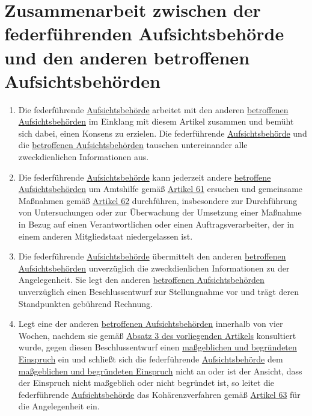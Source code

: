 \chapter{Zusammenarbeit zwischen der federführenden Aufsichtsbehörde und den anderen betroffenen Aufsichtsbehörden}
\label{ch:60}


\begin{enumerate}

  \item Die federführende \hyperref[itm:04-21]{Aufsichtsbehörde} arbeitet mit den anderen \hyperref[itm:04-22]{betroffenen Aufsichtsbehörden} im Einklang mit diesem
   Artikel zusammen und bemüht sich dabei, einen Konsens zu erzielen. Die federführende \hyperref[itm:04-21]{Aufsichtsbehörde} und die
   \hyperref[itm:04-22]{betroffenen Aufsichtsbehörden} tauschen untereinander alle zweckdienlichen Informationen aus.
  \label{itm:60-1}

  \item Die federführende \hyperref[itm:04-21]{Aufsichtsbehörde} kann jederzeit andere \hyperref[itm:04-22]{betroffene Aufsichtsbehörden} um Amtshilfe gemäß
  \hyperref[ch:61]{Artikel 61} ersuchen und gemeinsame Maßnahmen gemäß \hyperref[ch:62]{Artikel 62} durchführen,
   insbesondere zur Durchführung von Untersuchungen oder zur Überwachung der Umsetzung einer Maßnahme in Bezug auf
   einen Verantwortlichen oder einen Auftragsverarbeiter, der in einem anderen Mitgliedstaat niedergelassen ist.
  \label{itm:60-2}

  \item Die federführende \hyperref[itm:04-21]{Aufsichtsbehörde} übermittelt den anderen \hyperref[itm:04-22]{betroffenen Aufsichtsbehörden} unverzüglich die
   zweckdienlichen Informationen zu der Angelegenheit. Sie legt den anderen \hyperref[itm:04-22]{betroffenen Aufsichtsbehörden} unverzüglich
   einen Beschlussentwurf zur Stellungnahme vor und trägt deren Standpunkten gebührend Rechnung.
  \label{itm:60-3}

  \item Legt eine der anderen \hyperref[itm:04-22]{betroffenen Aufsichtsbehörden} innerhalb von vier Wochen, nachdem sie gemäß \hyperref
   [itm:60-3]{Absatz 3 des vorliegenden Artikels} konsultiert wurde, gegen diesen Beschlussentwurf einen \hyperref[itm:04-27]{maßgeblichen
   und begründeten Einspruch} ein und schließt sich die federführende \hyperref[itm:04-21]{Aufsichtsbehörde} dem \hyperref[itm:04-27]{maßgeblichen und begründeten
   Einspruch} nicht an oder ist der Ansicht, dass der Einspruch nicht maßgeblich oder nicht begründet ist, so leitet die
   federführende \hyperref[itm:04-21]{Aufsichtsbehörde} das Kohärenzverfahren gemäß \hyperref[ch:63]{Artikel 63} für die Angelegenheit ein.
  \label{itm:60-4}


\end{enumerate}
